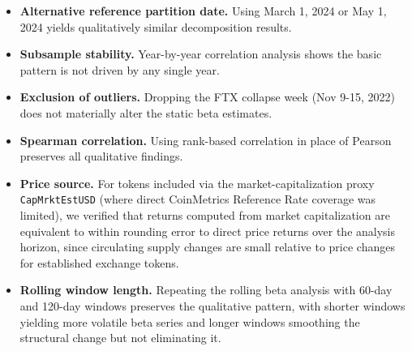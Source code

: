 \documentclass[11pt,a4paper]{article}
\begin{document}
\begin{itemize}
\item \textbf{Alternative reference partition date.} Using March 1, 2024 or May 1, 2024 yields qualitatively similar decomposition results.
\item \textbf{Subsample stability.} Year-by-year correlation analysis shows the basic pattern is not driven by any single year.
\item \textbf{Exclusion of outliers.} Dropping the FTX collapse week (Nov 9-15, 2022) does not materially alter the static beta estimates.
\item \textbf{Spearman correlation.} Using rank-based correlation in place of Pearson preserves all qualitative findings.
\item \textbf{Price source.} For tokens included via the market-capitalization proxy \texttt{CapMrktEstUSD} (where direct CoinMetrics Reference Rate coverage was limited), we verified that returns computed from market capitalization are equivalent to within rounding error to direct price returns over the analysis horizon, since circulating supply changes are small relative to price changes for established exchange tokens.
\item \textbf{Rolling window length.} Repeating the rolling beta analysis with 60-day and 120-day windows preserves the qualitative pattern, with shorter windows yielding more volatile beta series and longer windows smoothing the structural change but not eliminating it.
\end{itemize}
\end{document}
